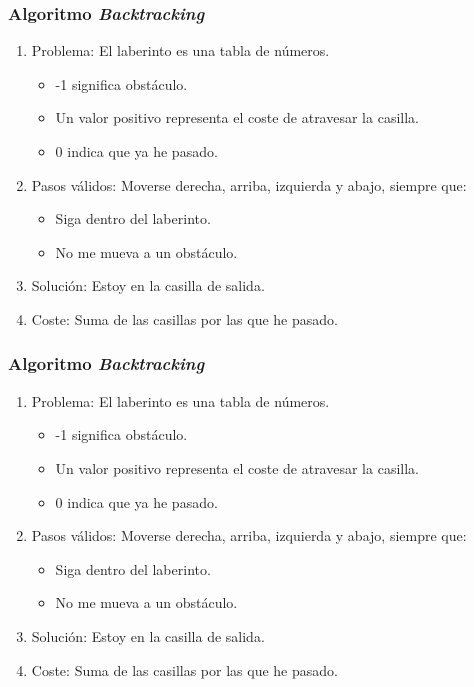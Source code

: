 \documentclass[a4paper,t,xcolor=pst,dvips,colortheme]{beamer}
\begin{document}
\begin{frame}[c]
    \frametitle{Algoritmo \emph{Backtracking}}
    \begin{enumerate}[<+->]
        \item Problema: El laberinto es una tabla de números. 
            \begin{itemize}
                \item -1 significa obstáculo.
                \item Un valor positivo representa el coste de atravesar la casilla.
                \item 0 indica que ya he pasado.
            \end{itemize}
        \item Pasos válidos: Moverse derecha, arriba, izquierda y abajo, siempre que: 
            \begin{itemize}
                \item Siga dentro del laberinto.
                \item No me mueva a un obstáculo.
            \end{itemize}
        \item Solución: Estoy en la casilla de salida.
        \item Coste: Suma de las casillas por las que he pasado.
    \end{enumerate}
\end{frame}

\begin{frame}[c]
    \frametitle{Algoritmo \emph{Backtracking}}
    \begin{enumerate}[<+->]
        \item Problema: El laberinto es una tabla de números.
            \begin{itemize}
                \item -1 significa obstáculo.
                \item Un valor positivo representa el coste de atravesar la casilla.
                \item 0 indica que ya he pasado.
            \end{itemize}
        \item Pasos válidos: Moverse derecha, arriba, izquierda y abajo, siempre que:
            \begin{itemize}
                \item Siga dentro del laberinto.
                \item No me mueva a un obstáculo.
            \end{itemize}
        \item Solución: Estoy en la casilla de salida.
        \item Coste: Suma de las casillas por las que he pasado.
    \end{enumerate}
\end{frame}
\end{document}
